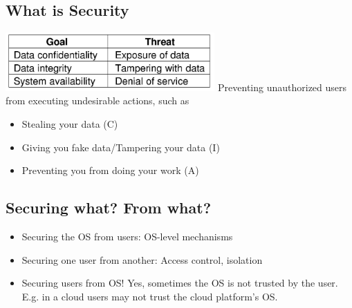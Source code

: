 \documentclass[12pt]{article}
\begin{document}
\subsection{What is Security}
\includegraphics[width=0.6\textwidth]{WhatisSecurity.png}
Preventing unauthorized users from executing undesirable actions, such as \begin{itemize}
    \item Stealing your data (C)
    \item Giving you fake data/Tampering your data (I)
    \item Preventing you from doing your work (A)
\end{itemize}
\subsection{Securing what? From what?}
\begin{itemize}
    \item Securing the OS from users: OS-level mechanisms
    \item Securing one user from another: Access control, isolation
    \item Securing users from OS! Yes, sometimes the OS is not trusted by the user. E.g. in a cloud users may not trust the cloud platform's OS.
\end{itemize}
\end{document}
